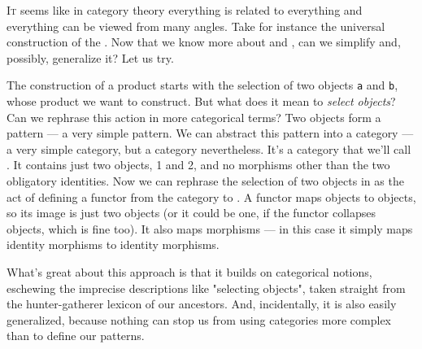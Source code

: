 \lettrine[lhang=0.17]{I}{t} seems like in category theory everything is related to everything and
everything can be viewed from many angles. Take for instance the
universal construction of the .
Now that we know more about  and
, can we simplify and, possibly, generalize it? Let us
try.

\begin{figure}[H]
    \centering
\end{figure}

The construction of a product starts with the selection of two objects
\texttt{a} and \texttt{b}, whose product we want to construct. But what
does it mean to \emph{select objects}? Can we rephrase this action in
more categorical terms? Two objects form a pattern --- a very simple
pattern. We can abstract this pattern into a category --- a very simple
category, but a category nevertheless. It's a category that we'll call
. It contains just two objects, 1 and 2, and no morphisms
other than the two obligatory identities. Now we can rephrase the
selection of two objects in  as the act of defining a functor 
from the category  to . A functor maps objects to
objects, so its image is just two objects (or it could be one, if the
functor collapses objects, which is fine too). It also maps morphisms
--- in this case it simply maps identity morphisms to identity
morphisms.

\begin{figure}[H]
    \centering
\end{figure}

What's great about this approach is that it builds on categorical
notions, eschewing the imprecise descriptions like "selecting
objects", taken straight from the hunter-gatherer lexicon of our
ancestors. And, incidentally, it is also easily generalized, because
nothing can stop us from using categories more complex than 
to define our patterns.

